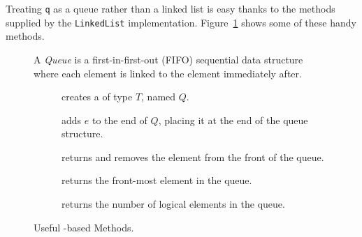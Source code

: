 Treating \texttt{q} as a queue rather than a linked list is easy thanks to the methods supplied by the \texttt{LinkedList} implementation. 
Figure~\ref{fig:queues} shows some of these handy methods. 

\begin{figure}[tp]
  \small
  \begin{tcolorbox}[title=Java Queue]
    A \emph{Queue} is a first-in-first-out (FIFO) sequential data structure where each element is linked to the element immediately after.
    \vspace{2ex}
  \begin{description}
    \item [] creates a  of type $T$, named $Q$.
     \item [] adds $e$ to the end of $Q$, placing it at the end of the queue structure.
     \item [] returns and removes the element from the front of the queue.
     \item [] returns the front-most element in the queue.
    \item [] returns the number of logical elements in the queue.
  \end{description}
\end{tcolorbox}
  \caption{Useful -based Methods.}
  \label{fig:queues}
\end{figure}

